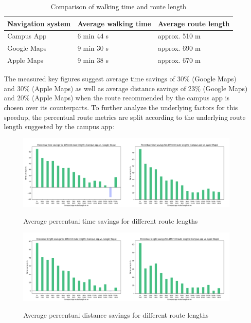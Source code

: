 \begin{table}[H]
	\small
	\centering
	\begin{tabular}{|l|l|l|}
		\hline
		\textbf{Navigation system}      & \textbf{Average walking time}       & \textbf{Average route length}  \\
		\hline
        Campus App             & 6 min 44 s	              	& approx. 510 m         \\
		\hline
        Google Maps            & 9 min 30 s              	& approx. 690 m         \\
		\hline
		Apple Maps             & 9 min 38 s              	& approx. 670 m         \\
		\hline
	\end{tabular}
	\caption{Comparison of walking time and route length}
\end{table}

The measured key figures suggest average time savings of 30\% (Google Maps) and 30\% (Apple Maps) as well as average distance savings of 23\% (Google Maps) and 20\% (Apple Maps) when the route recommended by the campus app is chosen over its counterparts. To further analyze the underlying factors for this speedup, the percentual route metrics are split according to the underlying route length suggested by the campus app:

\begin{figure}[H]
	\centering
	\includegraphics[width=1.0\textwidth]{images/time_differences.png}\\
	\caption{Average percentual time savings for different route lengths}
\end{figure}

\begin{figure}[H]
	\centering
	\includegraphics[width=1.0\textwidth]{images/length_differences.png}\\
	\caption{Average percentual distance savings for different route lengths}
\end{figure}

